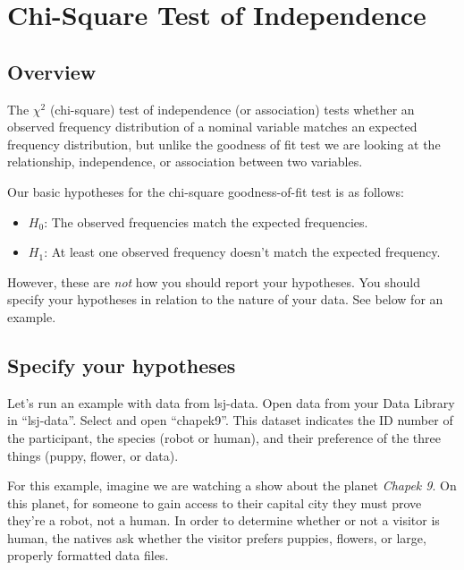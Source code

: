 \documentclass[
]{book}
\begin{document}
\hypertarget{chi-square-test-of-independence}{%
\section{Chi-Square Test of Independence}\label{chi-square-test-of-independence}}

\hypertarget{overview-4}{%
\subsection{Overview}\label{overview-4}}

The \(\chi^2\) (chi-square) test of independence (or association) tests whether an observed frequency distribution of a nominal variable matches an expected frequency distribution, but unlike the goodness of fit test we are looking at the relationship, independence, or association between two variables.

Our basic hypotheses for the chi-square goodness-of-fit test is as follows:

\begin{itemize}
\item
  \(H_0\): The observed frequencies match the expected frequencies.
\item
  \(H_1\): At least one observed frequency doesn't match the expected frequency.
\end{itemize}

However, these are \emph{not} how you should report your hypotheses. You should specify your hypotheses in relation to the nature of your data. See below for an example.

\hypertarget{specify-your-hypotheses-2}{%
\subsection{Specify your hypotheses}\label{specify-your-hypotheses-2}}

Let's run an example with data from lsj-data. Open data from your Data Library in ``lsj-data''. Select and open ``chapek9''. This dataset indicates the ID number of the participant, the species (robot or human), and their preference of the three things (puppy, flower, or data).

For this example, imagine we are watching a show about the planet \emph{Chapek 9}. On this planet, for someone to gain access to their capital city they must prove they're a robot, not a human. In order to determine whether or not a visitor is human, the natives ask whether the visitor prefers puppies, flowers, or large, properly formatted data files.
\end{document}

